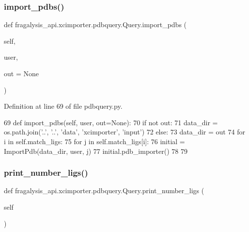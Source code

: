 \subsubsection{\texorpdfstring{import\+\_\+pdbs()}{import\_pdbs()}}
{\footnotesize\ttfamily def fragalysis\+\_\+api.\+xcimporter.\+pdbquery.\+Query.\+import\+\_\+pdbs (\begin{DoxyParamCaption}\item[{}]{self,  }\item[{}]{user,  }\item[{}]{out = {\ttfamily None} }\end{DoxyParamCaption})}



Definition at line 69 of file pdbquery.\+py.


\begin{DoxyCode}
69     \textcolor{keyword}{def }import\_pdbs(self, user, out=None):
70         \textcolor{keywordflow}{if} \textcolor{keywordflow}{not} out:
71             data\_dir = os.path.join(\textcolor{stringliteral}{'..'}, \textcolor{stringliteral}{'..'}, \textcolor{stringliteral}{'data'}, \textcolor{stringliteral}{'xcimporter'}, \textcolor{stringliteral}{'input'})
72         \textcolor{keywordflow}{else}:
73             data\_dir = out
74         \textcolor{keywordflow}{for} i \textcolor{keywordflow}{in} self.match\_ligs:
75             \textcolor{keywordflow}{for} j \textcolor{keywordflow}{in} self.match\_ligs[i]:
76                 initial = ImportPdb(data\_dir, user, j)
77                 initial.pdb\_importer()
78 
79 
\end{DoxyCode}
\mbox{\label{classfragalysis__api_1_1xcimporter_1_1pdbquery_1_1_query_a36dfa365ad219285d470107eba4e7080}} 
\subsubsection{\texorpdfstring{print\+\_\+number\+\_\+ligs()}{print\_number\_ligs()}}
{\footnotesize\ttfamily def fragalysis\+\_\+api.\+xcimporter.\+pdbquery.\+Query.\+print\+\_\+number\+\_\+ligs (\begin{DoxyParamCaption}\item[{}]{self }\end{DoxyParamCaption})}



